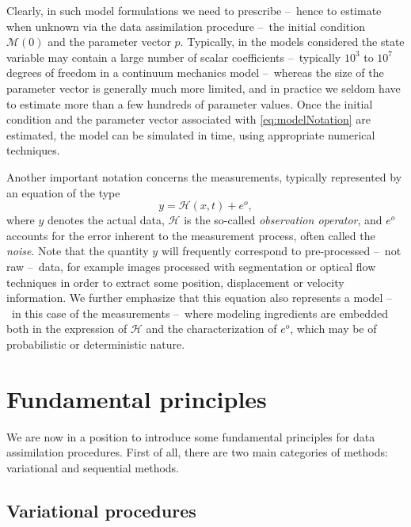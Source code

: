 Clearly, in such model formulations we need to prescribe --~hence to estimate when unknown via the data assimilation procedure --~the initial condition $\mathcal{M}(0)$ and the parameter vector $p$. Typically, in the models considered the state variable may contain a large number of scalar coefficients --~typically $10^3$ to $10^7$ degrees of freedom in a continuum mechanics model --~whereas the size of the parameter vector is generally much more limited, and in practice we seldom have to estimate more than a few hundreds of parameter values. Once the initial condition and the parameter vector associated with \eqref{eq:modelNotation} are estimated, the model can be simulated in time, using appropriate numerical techniques.

Another important notation concerns the measurements, typically represented by an equation of the type
\begin{equation}\label{eq:measNotation}
	y = \mathcal{H}(x,t) + e^o,
\end{equation}
where $y$ denotes the actual data, $\mathcal{H}$ is the so-called \emph{observation operator}, and $e^o$ accounts for the error inherent to the measurement process, often called the \emph{noise}. Note that the quantity $y$ will frequently correspond to pre-processed --~not raw --~data, for example images processed with segmentation or optical flow techniques in order to extract some position, displacement or velocity information. We further emphasize that this equation also represents a model --~in this case of the measurements --~where modeling ingredients are embedded both in the expression of $\mathcal{H}$ and the characterization of $e^o$, which may be of probabilistic or deterministic nature.


\section{Fundamental principles}

We are now in a position to introduce some fundamental principles for data assimilation procedures. First of all, there are two main categories of methods: variational and sequential methods.

\subsection{Variational procedures}

